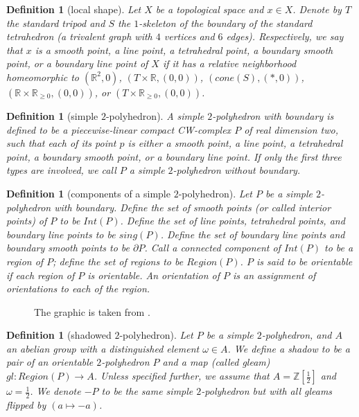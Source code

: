 \documentclass[12pt]{extarticle}
\numberwithin{equation}{section} %
\theoremstyle{mystyle}
\newtheorem{definition}[equation]{Definition}
\begin{document}
\begin{definition}[local shape]\label{def/local-shape}
  Let $X$ be a topological space and $x \in X$. Denote by $T$ the
  standard tripod and $S$ the $1$-skeleton of the boundary of the
  standard tetrahedron (a trivalent graph with $4$ vertices and
  $6$ edges). Respectively, we say that $x$ is a smooth point, a
  line point, a tetrahedral point, a boundary smooth point, or a
  boundary line point of $X$ if it has a relative neighborhood
  homeomorphic to $(\mathbb{R}^{2},0)$,
  $(T \times \mathbb{R}, (0, 0))$, $(cone(S), (*, 0))$,
  $(\mathbb{R} \times \mathbb{R}_{\geq 0}, (0, 0))$, or
  $(T \times \mathbb{R}_{\geq 0}, (0, 0))$.
\end{definition}

\begin{definition}[simple $2$-polyhedron]\label{def/simple-2-polyhedron}
  A simple $2$-polyhedron with boundary is defined to be a
  piecewise-linear compact CW-complex $P$ of real dimension two,
  such that each of its point $p$ is either a smooth point, a
  line point, a tetrahedral point, a boundary smooth point, or a
  boundary line point. If only the first three types are
  involved, we call $P$ a simple $2$-polyhedron without boundary.
\end{definition}

\begin{definition}[components of a simple $2$-polyhedron]\label{def/components-of-a-simple-2-polyhedron}
  Let $P$ be a simple $2$-polyhedron with boundary. Define the
  set of smooth points (or called interior points) of $P$ to be
  $Int(P)$. Define the set of line points, tetrahedral points,
  and boundary line points to be $sing(P)$. Define the set of
  boundary line points and boundary smooth points to be
  $\partial P$. Call a connected component of $Int(P)$ to be a
  region of $P$; define the set of regions to be $Region(P)$. $P$
  is said to be orientable if each region of $P$ is orientable.
  An orientation of $P$ is an assignment of orientations to each
  of the region.
\end{definition}

\begin{figure}[ht]
\centering
\begin{tikzpicture}

\end{tikzpicture}
\caption{The graphic is taken from \cite{khovanov-robert/foam}.}
\label{figure/3localmodel}
\end{figure}

\begin{definition}[shadowed $2$-polyhedron]\label{def/shadowed-2-polyhedron}
  Let $P$ be a simple $2$-polyhedron, and $A$ an abelian group
  with a distinguished element $\omega \in A$. We define a shadow
  to be a pair of an orientable $2$-polyhedron $P$ and a map
  (called gleam) $gl: Region(P) \to A$. Unless specified further,
  we assume that $A = \mathbb{Z}\left[\frac{1}{2}\right]$ and
  $\omega = \frac{1}{2}$. We denote $-P$ to be the same simple
  $2$-polyhedron but with all gleams flipped by $(a \mapsto -a)$.
\end{definition}
\end{document}
